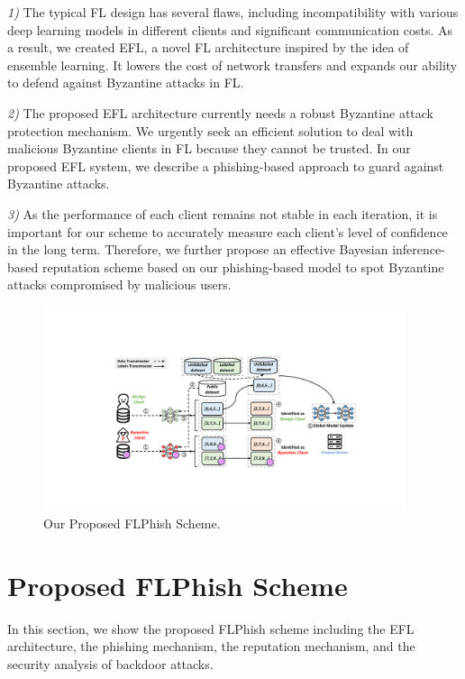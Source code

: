 \documentclass[lettersize,journal]{IEEEtran}
\begin{document}
\par \textit{1)} The typical FL design has several flaws, including incompatibility with various deep learning models in different clients and significant communication costs. As a result, we created EFL, a novel FL architecture inspired by the idea of ensemble learning. It lowers the cost of network transfers and expands our ability to defend against Byzantine attacks in FL.
\par \textit{2)} The proposed EFL architecture currently needs a robust Byzantine attack protection mechanism. We urgently seek an efficient solution to deal with malicious Byzantine clients in FL because they cannot be trusted. In our proposed EFL system, we describe a phishing-based approach to guard against Byzantine attacks.
\par \textit{3)} As the performance of each client remains not stable in each iteration, it is important for our scheme to accurately measure each client's level of confidence in the long term. Therefore, we further propose an effective Bayesian inference-based reputation scheme based on our phishing-based model to spot Byzantine attacks compromised by malicious users.

\begin{figure}
  \centering
\includegraphics[width=0.95\textwidth]{figures/Figure_FLPhish.pdf}
\caption{Our Proposed FLPhish Scheme.}
\label{fig_Phishing}
\end{figure}   


\section{Proposed FLPhish Scheme}
In this section, we show the proposed FLPhish scheme including the EFL architecture, the phishing mechanism, the reputation mechanism, and the security analysis of backdoor attacks.
\end{document}
